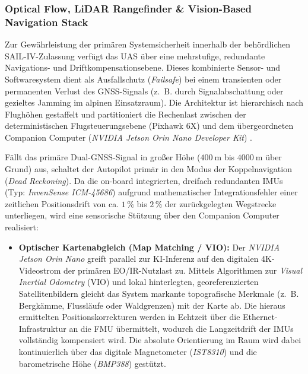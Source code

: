 \subsubsection{Optical Flow, LiDAR Rangefinder \texorpdfstring{\&}{\&} Vision-Based Navigation Stack}
\label{sec:navigation_failsafe_stack}

Zur Gewährleistung der primären Systemsicherheit innerhalb der behördlichen SAIL-IV-Zulassung verfügt das UAS über eine mehrstufige, redundante Navigations- 
und Driftkompensationsebene. Dieses kombinierte Sensor- und Softwaresystem dient als Ausfallschutz (\textit{Failsafe}) bei einem transienten oder permanenten 
Verlust des GNSS-Signals (z.~B. durch Signalabschattung oder gezieltes Jamming im alpinen Einsatzraum). Die Architektur ist hierarchisch nach Flughöhen gestaffelt 
und partitioniert die Rechenlast zwischen der deterministischen Flugsteuerungsebene (Pixhawk 6X) und dem übergeordneten Companion Computer 
(\textit{NVIDIA Jetson Orin Nano Developer Kit}) \cite{nvidia_jetson_orin_nano}.

Fällt das primäre Dual-GNSS-Signal in großer Höhe ($\SI{400}{\m}$ bis $\SI{4000}{\m}$ über Grund) aus, schaltet der Autopilot primär in den Modus der Koppelnavigation 
(\textit{Dead Reckoning}). Da die on-board integrierten, dreifach redundanten IMUs (Typ: \textit{InvenSense ICM-45686}) aufgrund mathematischer Integrationsfehler 
einer zeitlichen Positionsdrift von ca. $1\,\%$ bis $2\,\%$ der zurückgelegten Wegstrecke unterliegen, wird eine sensorische Stützung über den Companion Computer realisiert:

\begin{itemize}
    \item \textbf{Optischer Kartenabgleich (Map Matching / VIO):} Der \textit{NVIDIA Jetson Orin Nano} greift parallel zur KI-Inferenz auf den digitalen 4K-Videostrom 
                                                                der primären EO/IR-Nutzlast zu. Mittels Algorithmen zur \textit{Visual Inertial Odometry} (VIO) und lokal 
                                                                hinterlegten, georeferenzierten Satellitenbildern gleicht das System markante topografische Merkmale 
                                                                (z.~B. Bergkämme, Flussläufe oder Waldgrenzen) mit der Karte ab. Die hieraus ermittelten Positionskorrekturen 
                                                                werden in Echtzeit über die Ethernet-Infrastruktur an die FMU übermittelt, wodurch die Langzeitdrift der 
                                                                IMUs vollständig kompensiert wird. Die absolute Orientierung im Raum wird dabei kontinuierlich über das 
                                                                digitale Magnetometer (\textit{IST8310}) und die barometrische Höhe (\textit{BMP388}) gestützt.
\end{itemize}

